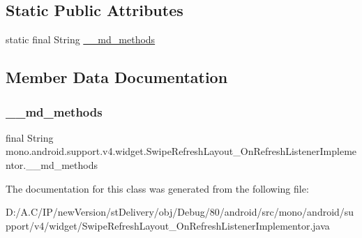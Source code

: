 \subsection*{Static Public Attributes}
\begin{DoxyCompactItemize}
\item 
static final String \hyperlink{classmono_1_1android_1_1support_1_1v4_1_1widget_1_1_swipe_refresh_layout___on_refresh_listener_implementor_a8eae272ca1cc576f55b51a0e86c522b2}{\+\_\+\+\_\+md\+\_\+methods}
\end{DoxyCompactItemize}


\subsection{Member Data Documentation}
\mbox{\label{classmono_1_1android_1_1support_1_1v4_1_1widget_1_1_swipe_refresh_layout___on_refresh_listener_implementor_a8eae272ca1cc576f55b51a0e86c522b2}} 
\subsubsection{\texorpdfstring{\+\_\+\+\_\+md\+\_\+methods}{\_\_md\_methods}}
{\footnotesize\ttfamily final String mono.\+android.\+support.\+v4.\+widget.\+Swipe\+Refresh\+Layout\+\_\+\+On\+Refresh\+Listener\+Implementor.\+\_\+\+\_\+md\+\_\+methods\hspace{0.3cm}{\ttfamily [static]}}



The documentation for this class was generated from the following file\+:\begin{DoxyCompactItemize}
\item 
D\+:/\+A.\+C/\+I\+P/new\+Version/st\+Delivery/obj/\+Debug/80/android/src/mono/android/support/v4/widget/Swipe\+Refresh\+Layout\+\_\+\+On\+Refresh\+Listener\+Implementor.\+java\end{DoxyCompactItemize}
